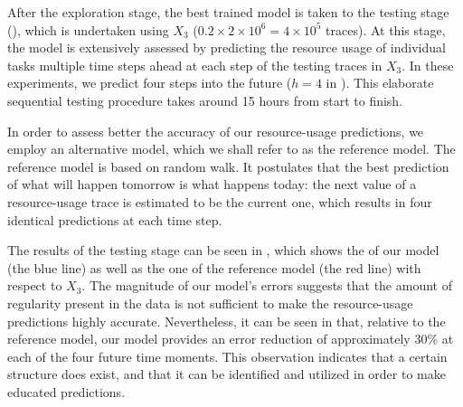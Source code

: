 After the exploration stage, the best trained model is taken to the testing
stage (), which is undertaken using $X_3$ ($0.2 \times 2 \times
10^6 = 4 \times 10^5$ traces). At this stage, the model is extensively assessed
by predicting the resource usage of individual tasks multiple time steps ahead
at each step of the testing traces in $X_3$. In these experiments, we predict
four steps into the future ($h = 4$ in ). This elaborate
sequential testing procedure takes around 15 hours from start to finish.

In order to assess better the accuracy of our resource-usage predictions, we
employ an alternative model, which we shall refer to as the reference model. The
reference model is based on random walk. It postulates that the best prediction
of what will happen tomorrow is what happens today: the next value of a
resource-usage trace is estimated to be the current one, which results in four
identical predictions at each time step.

The results of the testing stage can be seen in , which shows the
 of our model (the blue line) as well as the one of the reference model
(the red line) with respect to $X_3$. The magnitude of our model's errors
suggests that the amount of regularity present in the data is not sufficient to
make the resource-usage predictions highly accurate. Nevertheless, it can be
seen in  that, relative to the reference model, our model provides
an error reduction of approximately 30\% at each of the four future time
moments. This observation indicates that a certain structure does exist, and
that it can be identified and utilized in order to make educated predictions.

